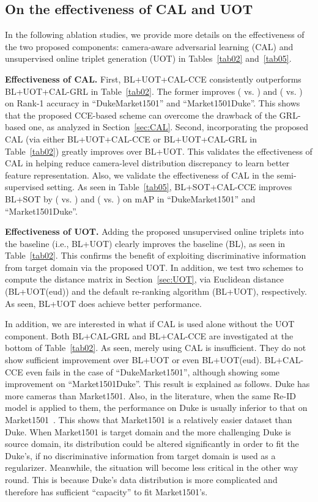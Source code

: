 \documentclass[10pt,twocolumn,letterpaper]{article}
\begin{document}
\subsection{On the effectiveness of CAL and UOT}\label{sec:EXP-AS}
In the following ablation studies, we provide more details on the effectiveness of the two proposed components: camera-aware adversarial learning (CAL) and unsupervised online triplet generation (UOT) in Tables~\ref{tab02} and~\ref{tab05}.


\textbf{Effectiveness of CAL.}
First, BL+UOT+CAL-CCE consistently outperforms BL+UOT+CAL-GRL in Table~\ref{tab02}. The former improves  ( vs. ) and  ( vs. ) on Rank-1 accuracy in ``DukeMarket1501'' and ``Market1501Duke''. This shows that the proposed CCE-based scheme can overcome the drawback of the GRL-based one, as analyzed in Section~\ref{sec:CAL}. Second, incorporating the proposed CAL (via either BL+UOT+CAL-CCE or BL+UOT+CAL-GRL in Table~\ref{tab02}) greatly improves over BL+UOT. This validates the effectiveness of CAL in helping reduce camera-level distribution discrepancy to learn better feature representation. Also, we validate the effectiveness of CAL in the semi-supervised setting. As seen in Table~\ref{tab05}, BL+SOT+CAL-CCE improves BL+SOT by  ( vs. ) and  ( vs. ) on mAP in ``DukeMarket1501'' and ``Market1501Duke''. 
 
\textbf{Effectiveness of UOT.}
Adding the proposed unsupervised online triplets into the baseline (i.e., BL+UOT) clearly improves the baseline (BL), as seen in Table~\ref{tab02}. This confirms the benefit of exploiting discriminative information from target domain via the proposed UOT. In addition, we test two schemes to compute the distance matrix  in Section~\ref{sec:UOT}, via Euclidean distance (BL+UOT(eud)) and the default re-ranking algorithm (BL+UOT), respectively. As seen, BL+UOT does achieve better performance. 
 
 
In addition, we are interested in what if CAL is used alone without the UOT component. Both BL+CAL-GRL and BL+CAL-CCE are investigated at the bottom of Table~\ref{tab02}. As seen, merely using CAL is insufficient. They do not show sufficient improvement over BL+UOT or even BL+UOT(eud). BL+CAL-CCE even fails in the case of ``DukeMarket1501'', although showing some improvement on ``Market1501Duke''. This result is explained as follows. Duke has more cameras than Market1501. Also, in the literature, when the same Re-ID model is applied to them, the performance on Duke is usually inferior to that on Market1501~\cite{DBLP:conf/cvpr/LiZXW14,DBLP:conf/cvpr/AhmedJM15,DBLP:conf/iccv/ZhengZY17,kalayeh2018human}. This shows that Market1501 is a relatively easier dataset than Duke. When Market1501 is target domain and the more challenging Duke is source domain, its distribution could be altered significantly in order to fit the Duke's, if no discriminative information from target domain is used as a regularizer. Meanwhile, the situation will become less critical in the other way round. This is because Duke's data distribution is more complicated and therefore has sufficient ``capacity'' to fit Market1501's. 
\end{document}

